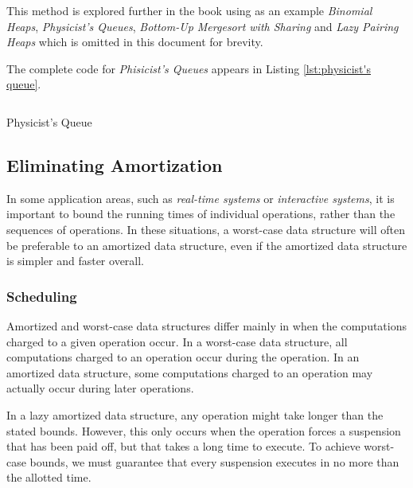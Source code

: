 \documentclass[12pt, a4paper]{article} %
\begin{document}
This method is explored further in the book using as an example \textit{Binomial Heaps}, \textit{Physicist's Queues}, \textit{Bottom-Up Mergesort with Sharing} and \textit{Lazy Pairing Heaps} which is omitted in this document for brevity.

The complete code for \textit{Phisicist's Queues} appears in Listing \ref{lst:physicist's queue}.

\begin{listing}[H]
  \inputminted[breaklines=true]{haskell}{../../Chapter6/PhysicistQueue.hs}
  \caption{Physicist's Queue}
  \label{lst:physicist's queue}
\end{listing}













\subsection{Eliminating Amortization}%
\label{sub:Eliminating Amortization}

In some application areas, such as \textit{real-time systems} or \textit{interactive systems}, it is important to bound the running times of individual operations, rather than the sequences of operations. In these situations, a worst-case data structure will often be preferable to an amortized data structure, even if the amortized data structure is simpler and faster overall.

\subsubsection{Scheduling}%
\label{ssub:Scheduling}

Amortized and worst-case data structures differ mainly in when the computations charged to a given operation occur. In a worst-case data structure, all computations charged to an operation occur during the operation. In an amortized data structure, some computations charged to an operation may actually occur during later operations.

In a lazy amortized data structure, any operation might take longer than the stated bounds. However, this only occurs when the operation forces a suspension that has been paid off, but that takes a long time to execute. To achieve worst-case bounds, we must guarantee that every suspension executes in no more than the allotted time.
\end{document}
